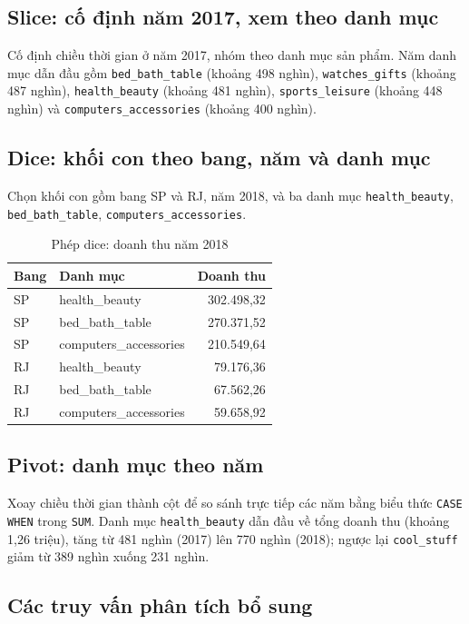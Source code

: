 \documentclass[12pt,a4paper]{article}
\newcommand{\code}[1]{\texttt{\small #1}}
\begin{document}
\subsection{Slice: cố định năm 2017, xem theo danh mục}
Cố định chiều thời gian ở năm 2017, nhóm theo danh mục sản phẩm. Năm danh mục dẫn đầu gồm
\code{bed\_bath\_table} (khoảng 498 nghìn), \code{watches\_gifts} (khoảng 487 nghìn), \code{health\_beauty}
(khoảng 481 nghìn), \code{sports\_leisure} (khoảng 448 nghìn) và \code{computers\_accessories} (khoảng 400 nghìn).

\subsection{Dice: khối con theo bang, năm và danh mục}
Chọn khối con gồm bang SP và RJ, năm 2018, và ba danh mục \code{health\_beauty}, \code{bed\_bath\_table},
\code{computers\_accessories}.

\begin{table}[h]
\centering
\caption{Phép dice: doanh thu năm 2018}
\small
\begin{tabular}{@{}l l r@{}}
\toprule
\textbf{Bang} & \textbf{Danh mục} & \textbf{Doanh thu}\\
\midrule
SP & health\_beauty & 302.498,32\\
SP & bed\_bath\_table & 270.371,52\\
SP & computers\_accessories & 210.549,64\\
RJ & health\_beauty & 79.176,36\\
RJ & bed\_bath\_table & 67.562,26\\
RJ & computers\_accessories & 59.658,92\\
\bottomrule
\end{tabular}
\end{table}

\subsection{Pivot: danh mục theo năm}
Xoay chiều thời gian thành cột để so sánh trực tiếp các năm bằng biểu thức \code{CASE WHEN} trong
\code{SUM}. Danh mục \code{health\_beauty} dẫn đầu về tổng doanh thu (khoảng 1,26 triệu), tăng từ 481 nghìn
(2017) lên 770 nghìn (2018); ngược lại \code{cool\_stuff} giảm từ 389 nghìn xuống 231 nghìn.

\subsection{Các truy vấn phân tích bổ sung}
\end{document}
